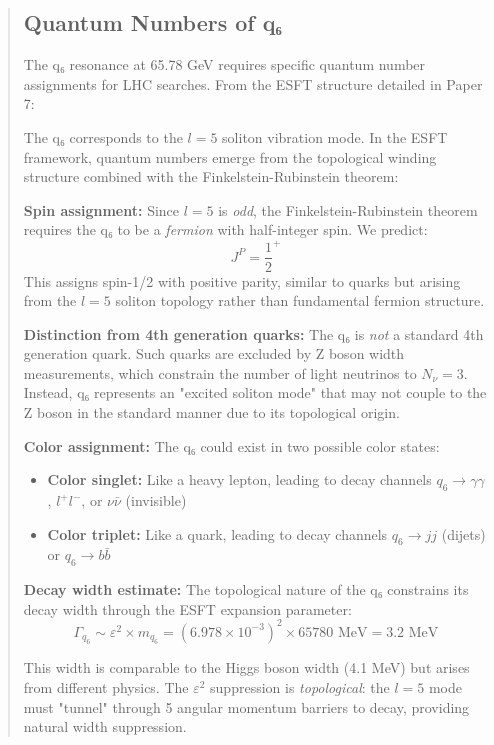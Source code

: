 ﻿\documentclass[twocolumn,prd,amsmath,amssymb,aps]{revtex4-2}
\begin{document}
\begin{abstract}
\subsection{Quantum Numbers of q₆}

The q₆ resonance at 65.78 GeV requires specific quantum number assignments for LHC searches. From the ESFT structure detailed in Paper 7:

The q₆ corresponds to the $l=5$ soliton vibration mode. In the ESFT framework, quantum numbers emerge from the topological winding structure combined with the Finkelstein-Rubinstein theorem:

\textbf{Spin assignment:} Since $l=5$ is \emph{odd}, the Finkelstein-Rubinstein theorem requires the q₆ to be a \emph{fermion} with half-integer spin. We predict:
\begin{equation}
J^P = \frac{1}{2}^+
\end{equation}
This assigns spin-1/2 with positive parity, similar to quarks but arising from the $l=5$ soliton topology rather than fundamental fermion structure.

\textbf{Distinction from 4th generation quarks:} The q₆ is \emph{not} a standard 4th generation quark. Such quarks are excluded by Z boson width measurements, which constrain the number of light neutrinos to $N_\nu = 3$. Instead, q₆ represents an "excited soliton mode" that may not couple to the Z boson in the standard manner due to its topological origin.

\textbf{Color assignment:} The q₆ could exist in two possible color states:
\begin{itemize}
\item \textbf{Color singlet:} Like a heavy lepton, leading to decay channels $q_6 \to \gamma\gamma$, $l^+l^-$, or $\nu\bar{\nu}$ (invisible)
\item \textbf{Color triplet:} Like a quark, leading to decay channels $q_6 \to jj$ (dijets) or $q_6 \to b\bar{b}$
\end{itemize}

\textbf{Decay width estimate:} The topological nature of the q₆ constrains its decay width through the ESFT expansion parameter:
\begin{equation}
\Gamma_{q_6} \sim \varepsilon^2 \times m_{q_6} = (6.978 \times 10^{-3})^2 \times 65780 \text{ MeV} = 3.2 \text{ MeV}
\end{equation}

This width is comparable to the Higgs boson width (4.1 MeV) but arises from different physics. The $\varepsilon^2$ suppression is \emph{topological}: the $l=5$ mode must "tunnel" through 5 angular momentum barriers to decay, providing natural width suppression.


\end{abstract}
\end{document}
